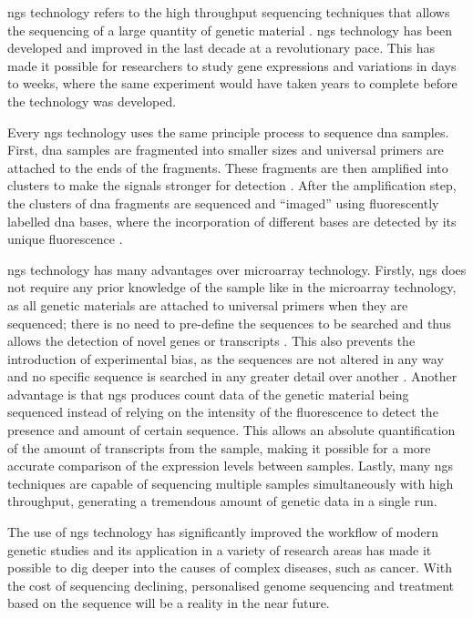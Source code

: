 \Gls{ngs} technology refers to the high throughput sequencing techniques that allows the sequencing of a large quantity of genetic material \citep{Metzker2010}.
\gls{ngs} technology has been developed and improved in the last decade at a revolutionary pace.
This has made it possible for researchers to study gene expressions and variations in days to weeks, where the same experiment would have taken years to complete before the technology was developed.

Every \gls{ngs} technology uses the same principle process to sequence \acrshort{dna} samples.
First, \acrshort{dna} samples are fragmented into smaller sizes and universal primers are attached to the ends of the fragments.
These fragments are then amplified into clusters to make the signals stronger for detection \citep{Metzker2010}.
After the amplification step, the clusters of \acrshort{dna} fragments are sequenced and ``imaged'' using fluorescently labelled \acrshort{dna} bases, where the incorporation of different bases are detected by its unique fluorescence \citep{Metzker2010}.

\gls{ngs} technology has many advantages over microarray technology.
Firstly, \gls{ngs} does not require any prior knowledge of the sample like in the microarray technology, as all genetic materials are attached to universal primers when they are sequenced; there is no need to pre-define the sequences to be searched and thus allows the detection of novel genes or transcripts \citep{Hurd2009}.
This also prevents the introduction of experimental bias, as the sequences are not altered in any way and no specific sequence is searched in any greater detail over another \citep{Hurd2009}.
Another advantage is that \gls{ngs} produces count data of the genetic material being sequenced instead of relying on the intensity of the fluorescence to detect the presence and amount of certain sequence.
This allows an absolute quantification of the amount of transcripts from the sample, making it possible for a more accurate comparison of the expression levels between samples.
Lastly, many \gls{ngs} techniques are capable of sequencing multiple samples simultaneously with high throughput, generating a tremendous amount of genetic data in a single run.

The use of \gls{ngs} technology has significantly improved the workflow of modern genetic studies and its application in a variety of research areas has made it possible to dig deeper into the causes of complex diseases, such as cancer.
With the cost of sequencing declining, personalised genome sequencing and treatment based on the sequence will be a reality in the near future.

